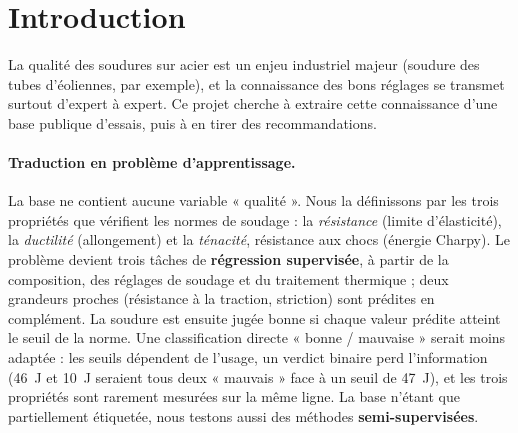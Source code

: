 \section{Introduction}

La qualité des soudures sur acier est un enjeu industriel majeur (soudure des tubes
d'éoliennes, par exemple), et la connaissance des bons réglages se transmet surtout
d'expert à expert. Ce projet cherche à extraire cette connaissance d'une base publique
d'essais, puis à en tirer des recommandations.

\paragraph{Traduction en problème d'apprentissage.} La base ne contient aucune variable
« qualité ». Nous la définissons par les trois propriétés que vérifient les normes de
soudage \cite{iso2560,awsa51} : la \emph{résistance} (limite d'élasticité), la
\emph{ductilité} (allongement) et la \emph{ténacité}, résistance aux chocs (énergie
Charpy). Le problème devient trois tâches de \textbf{régression supervisée}, à partir de
la composition, des réglages de soudage et du traitement thermique ; deux grandeurs
proches (résistance à la traction, striction) sont prédites en complément. La soudure
est ensuite jugée bonne si chaque valeur prédite atteint le seuil de la norme. Une
classification directe « bonne / mauvaise » serait moins adaptée : les seuils dépendent
de l'usage, un verdict binaire perd l'information (\SI{46}{\joule} et \SI{10}{\joule}
seraient tous deux « mauvais » face à un seuil de \SI{47}{\joule}), et les trois
propriétés sont rarement mesurées sur la même ligne. La base n'étant que partiellement
étiquetée, nous testons aussi des méthodes \textbf{semi-supervisées}.
